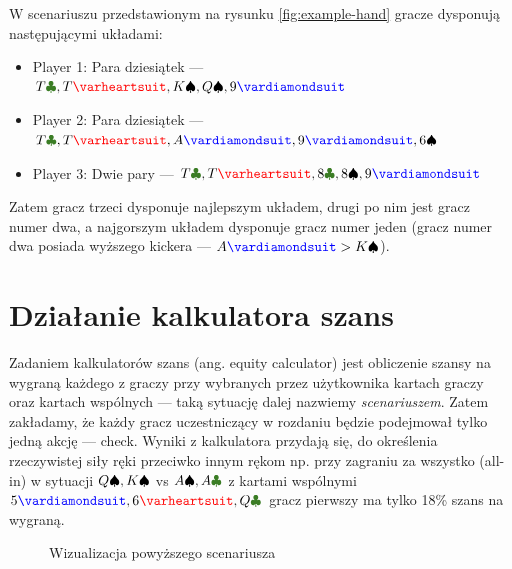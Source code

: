 \newpage{}

W scenariuszu przedstawionym na rysunku \ref{fig:example-hand} gracze dysponują następującymi układami:
\begin{itemize}
    \item Player 1: Para dziesiątek --- $T\clubs, T\hearts, K\spades, Q\spades, 9\diamonds $
    \item Player 2: Para dziesiątek --- $T\clubs, T\hearts, A\diamonds, 9\diamonds, 6\spades $
    \item Player 3: Dwie pary --- $T\clubs, T\hearts, 8\clubs, 8\spades, 9\diamonds $
\end{itemize}

Zatem gracz trzeci dysponuje najlepszym układem, drugi po nim jest gracz numer dwa, a najgorszym układem dysponuje gracz numer jeden (gracz numer dwa posiada wyższego kickera --- $A\diamonds > K\spades$).

\section{Działanie kalkulatora szans}

Zadaniem kalkulatorów szans (ang. equity calculator) jest obliczenie szansy na wygraną każdego z graczy przy wybranych przez użytkownika kartach graczy oraz kartach wspólnych --- taką sytuację dalej nazwiemy \emph{scenariuszem}. Zatem zakładamy, że każdy gracz uczestniczący w rozdaniu będzie podejmował tylko jedną akcję --- check. Wyniki z kalkulatora przydają się, do określenia rzeczywistej siły ręki przeciwko innym rękom np. przy zagraniu za wszystko (all-in) w sytuacji $Q\spadesuit, K\spadesuit$ vs $A\spades, A\clubs$ z kartami wspólnymi $5\diamonds, 6\hearts, Q\clubs$ gracz pierwszy ma tylko 18\% szans na wygraną.

\begin{figure}[ht]
    \caption{Wizualizacja powyższego scenariusza}
    \label{fig:example-hand-2}    
\end{figure}

